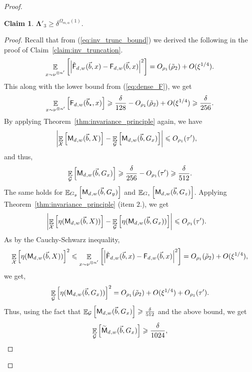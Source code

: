 \documentclass[10pt,a4paper]{amsart}
\newtheorem{claim}[thm]{Claim}
\newcommand\card[1]{\left| {#1} \right|}
\newcommand\Expect[2]{{\mathop{\mathbb{E}}_{#1}\left[ {#2} \right]}}
\renewcommand\geq{\geqslant}
\renewcommand\leq{\leqslant}
\newcommand{\V}[1]{{#1}}
\begin{document}
\begin{proof}
   \begin{claim}\label{claim:inv_gaussian_lb} $\mathbf{\Lambda}'_3 \geq \delta^{\Omega_{m,\alpha}(1)}.$
   \end{claim}
   \begin{proof}
   Recall that from (\ref{eq:inv_trunc_bound}) we derived the following in the proof of Claim~\ref{claim:inv_truncation}.
       $$\Expect{\substack{\V x\sim \nu^{\otimes n'}}}{\card{\truncfcoarsedecoupled_{,\V w}(\vec{b},\V x) - \fcoarsedecoupled_{,\V w}(\vec{b},\V x) }^2} = O_{\rho_1}(\tilde{\rho}_2) + O(\xi^{1/4}).$$
       This along with the lower bound from (\ref{eq:dense_F}), we get
       $$\Expect{\V x\sim \nu^{\otimes n'}}{\fcoarsedecoupled_{,\V w}(\vec{b}_\star,\V x)  } \geq \frac{\delta}{128} -  O_{\rho_1}(\tilde{\rho}_2) + O(\xi^{1/4})\geq \frac{\delta}{256}.$$
 By applying Theorem~\ref{thm:invariance_principle} again, we have 
\begin{align*}
\card{\Expect{\mathcal{X}}{\multilinfcoarsedecoupled_{,\V w}(\vec{b}, X)} - \Expect{\mathcal{G}}{\multilinfcoarsedecoupled_{,\V w}(\vec{b},\V G_x)}} &\leq O_{\rho_1}(\tau'),
\end{align*}
and thus,
\begin{align*}
\Expect{\mathcal{G}}{\multilinfcoarsedecoupled_{,\V w}(\vec{b},\V G_x)}\geq \frac{\delta}{256} - O_{\rho_1}(\tau')\geq \frac{\delta}{512}.
\end{align*}
The same holds for $\Expect{G_y}{\multilinfcoarsedecoupled_{,\V w}(\vec{b},  \V G_y)}$ and $\Expect{G_z}{\multilinfcoarsedecoupled_{,\V w}(\vec{b}, \V G_z)}$. Applying Theorem~\ref{thm:invariance_principle} (item $2$.), we get
\begin{align*}
\card{\Expect{\mathcal{X}}{\eta(\multilinfcoarsedecoupled_{,\V w}(\vec{b}, X))} - \Expect{\mathcal{G}}{\eta(\multilinfcoarsedecoupled_{,\V w}(\vec{b},\V G_x))}} &\leq O_{\rho_1}(\tau').
\end{align*}
As by the Cauchy-Schwarz inequality,
$$\Expect{\mathcal{X}}{\eta(\multilinfcoarsedecoupled_{,\V w}(\vec{b}, X))}^2 \leq \Expect{\substack{\V x\sim \nu^{\otimes n'}}}{\card{\truncfcoarsedecoupled_{,\V w}(\vec{b},\V x) - \fcoarsedecoupled_{,\V w}(\vec{b},\V x) }^2} = O_{\rho_1}(\tilde{\rho}_2) + O(\xi^{1/4}),$$
we get,
\begin{equation}\label{eq:trunc_gauss_small}\Expect{\mathcal{G}}{\eta(\multilinfcoarsedecoupled_{,\V w}(\vec{b},\V G_x))}^2 = O_{\rho_1}(\tilde{\rho}_2) + O(\xi^{1/4}) + O_{\rho_1}(\tau').
\end{equation}
Thus, using the fact that $\Expect{\mathcal{G}}{\multilinfcoarsedecoupled_{,\V w}(\vec{b},\V G_x)}\geq  \frac{\delta}{512}$ and the above bound, we get
\begin{align*}
\Expect{\mathcal{G}}{\truncmultilinfcoarsedecoupled_{,\V w}(\vec{b},\V G_x)}\geq \frac{\delta}{1024},
\end{align*}


\end{proof}
\end{proof}
\end{document}
